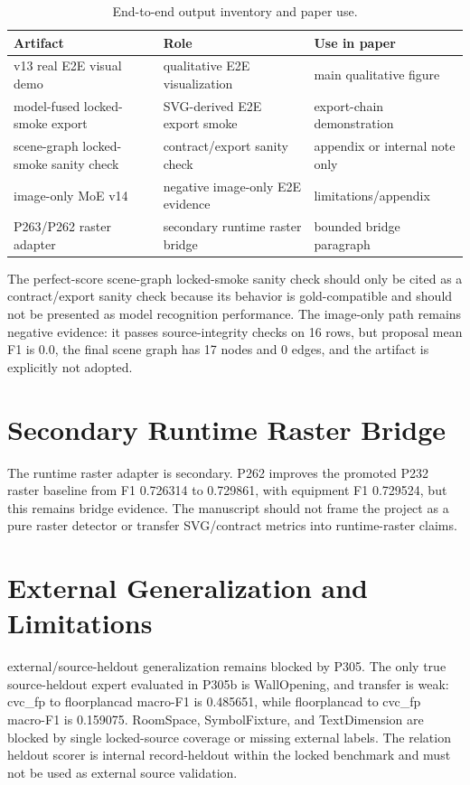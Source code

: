 \documentclass[11pt]{article}
\begin{document}
\begin{table}[t]
\centering
\small
\caption{End-to-end output inventory and paper use.}
\label{tab:p308_e2e_inventory}
\begin{tabular}{lll}
\toprule
Artifact & Role & Use in paper \\
\midrule
v13 real E2E visual demo & qualitative E2E visualization & main qualitative figure \\
model-fused locked-smoke export & SVG-derived E2E export smoke & export-chain demonstration \\
scene-graph locked-smoke sanity check & contract/export sanity check & appendix or internal note only \\
image-only MoE v14 & negative image-only E2E evidence & limitations/appendix \\
P263/P262 raster adapter & secondary runtime raster bridge & bounded bridge paragraph \\
\bottomrule
\end{tabular}
\end{table}

The perfect-score scene-graph locked-smoke sanity check should only be cited as a contract/export sanity check because its behavior is gold-compatible and should not be presented as model recognition performance. The image-only path remains negative evidence: it passes source-integrity checks on 16 rows, but proposal mean F1 is 0.0, the final scene graph has 17 nodes and 0 edges, and the artifact is explicitly not adopted.

\section{Secondary Runtime Raster Bridge}
The runtime raster adapter is secondary. P262 improves the promoted P232 raster baseline from F1 0.726314 to 0.729861, with equipment F1 0.729524, but this remains bridge evidence. The manuscript should not frame the project as a pure raster detector or transfer SVG/contract metrics into runtime-raster claims.

\section{External Generalization and Limitations}
external/source-heldout generalization remains blocked by P305. The only true source-heldout expert evaluated in P305b is WallOpening, and transfer is weak: cvc\_fp to floorplancad macro-F1 is 0.485651, while floorplancad to cvc\_fp macro-F1 is 0.159075. RoomSpace, SymbolFixture, and TextDimension are blocked by single locked-source coverage or missing external labels. The relation heldout scorer is internal record-heldout within the locked benchmark and must not be used as external source validation.
\end{document}
